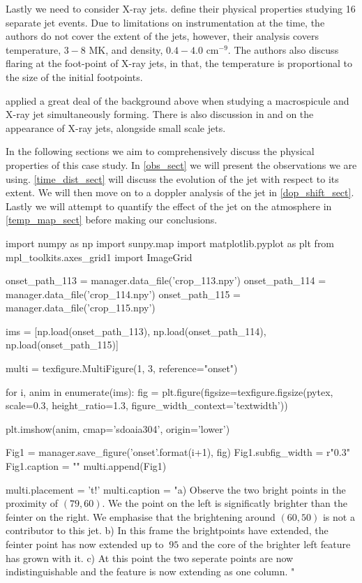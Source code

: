 \documentclass{emulateapj}
\begin{document}
Lastly we need to consider X-ray jets.
\cite{Shimojo2000} define their physical properties studying 16 separate jet events.
Due to limitations on instrumentation at the time, the authors do not cover the extent of the jets, however, their analysis covers temperature, $3 - 8$ MK, and density, $0.4 - 4.0$ cm$^{-9}$.
The authors also discuss flaring at the foot-point of X-ray jets, in that, the temperature is proportional to the size of the initial footpoints.

\cite{Kamio2010} applied a great deal of the background above when studying a macrospicule and X-ray jet simultaneously forming. There is also discussion in \cite{Pike_Harrison1997} and \cite{Kim2007} on the appearance of X-ray jets, alongside small scale jets.

In the following sections we aim to comprehensively discuss the physical properties of this case study. In \ref{obs_sect} we will present the observations we are using. \ref{time_dist_sect} will discuss the evolution of the jet with respect to its extent. We will then move on to a doppler analysis of the jet in \ref{dop_shift_sect}. Lastly we will attempt to quantify the effect of the jet on the atmosphere in \ref{temp_map_sect} before making our conclusions.






\begin{pycode}[Onset]
import numpy as np
import sunpy.map
import matplotlib.pyplot as plt
from mpl_toolkits.axes_grid1 import ImageGrid

onset_path_113 = manager.data_file('crop_113.npy')
onset_path_114 = manager.data_file('crop_114.npy')
onset_path_115 = manager.data_file('crop_115.npy')

ims = [np.load(onset_path_113), np.load(onset_path_114), np.load(onset_path_115)]


multi = texfigure.MultiFigure(1, 3, reference="onset")

for i, anim in enumerate(ims):
	fig = plt.figure(figsize=texfigure.figsize(pytex, scale=0.3, height_ratio=1.3, figure_width_context='textwidth'))
	
	plt.imshow(anim, cmap='sdoaia304', origin='lower')
	
	Fig1 = manager.save_figure('onset{}'.format(i+1), fig)
	Fig1.subfig_width = r"0.3\textwidth"
	Fig1.caption = ""
	multi.append(Fig1)

multi.placement = 't!'
multi.caption = "a) Observe the two bright points in the proximity of $(79, 60)$. We the point on the left is significatly brighter than the feinter on the right. We emphasise that the brightening around $(60, 50)$ is not a contributor to this jet. b) In this frame the brightpoints have extended, the feinter point has now extended up to $~95$ and the core of the brighter left feature has grown with it. c) At this point the two seperate points are now indistinguishable and the feature is now extending as one column. "
\end{pycode}
\end{document}
